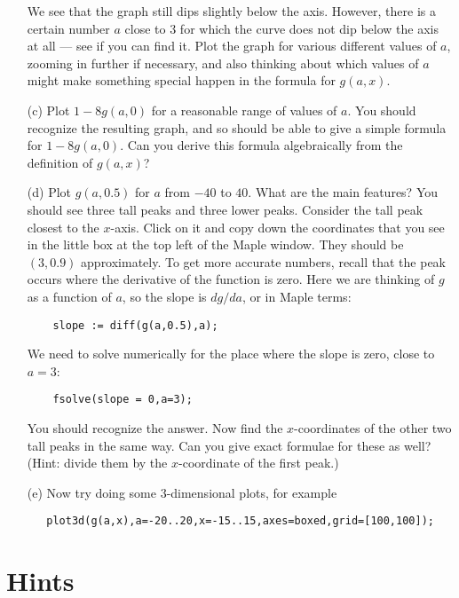 \documentclass[a4paper,10pt]{amsbook}
\numberwithin{example}{chapter}
\begin{document}
\begin{exercise}
\begin{itemize}
   We see that the graph still dips slightly below the axis.
   However, there is a certain number $a$ close to $3$ for
   which the curve does not dip below the axis at all ---
   see if you can find it.  Plot the graph for various
   different values of $a$, zooming in further if necessary,
   and also thinking about which values of $a$ might make
   something special happen in the formula for $g(a,x)$.
  \item[(c)] Plot $1-8g(a,0)$ for a reasonable range of
   values of $a$.  You should recognize the resulting graph,
   and so should be able to give a simple formula for
   $1-8g(a,0)$.  Can you derive this formula algebraically
   from the definition of $g(a,x)$?
  \item[(d)] Plot $g(a,0.5)$ for $a$ from $-40$ to $40$.
   What are the main features?  You should see three tall
   peaks and three lower peaks.  Consider the tall peak
   closest to the $x$-axis.  Click on it and copy down the
   coordinates that you see in the little box at the top
   left of the Maple window.  They should be $(3,0.9)$
   approximately.  To get more accurate numbers, recall that
   the peak occurs where the derivative of the function is
   zero.  Here we are thinking of $g$ as a function of $a$,
   so the slope is $dg/da$, or in Maple terms:
\begin{verbatim}
    slope := diff(g(a,0.5),a);
\end{verbatim}
   We need to solve numerically for the place where the
   slope is zero, close to $a=3$:
\begin{verbatim}
    fsolve(slope = 0,a=3);
\end{verbatim}
   You should recognize the answer.  Now find the
   $x$-coordinates of the other two tall peaks in the same
   way.  Can you give exact formulae for these as well?
   (Hint: divide them by the $x$-coordinate of the first
   peak.)
  \item[(e)] Now try doing some $3$-dimensional plots, for
   example
\begin{verbatim}
   plot3d(g(a,x),a=-20..20,x=-15..15,axes=boxed,grid=[100,100]);
\end{verbatim}
 \end{itemize}
\end{exercise}

\section*{Hints}
\end{document}
